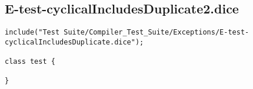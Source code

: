 \subsection{E-test-cyclicalIncludesDuplicate2.dice}
\begin{verbatim}
include("Test Suite/Compiler_Test_Suite/Exceptions/E-test-cyclicalIncludesDuplicate.dice");

class test {
	
}

\end{verbatim}